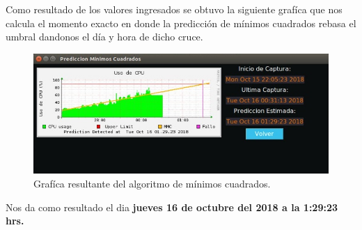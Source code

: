 Como resultado de los valores ingresados se obtuvo la siguiente grafíca que nos calcula el momento exacto en donde la predicción de mínimos cuadrados rebasa el umbral dandonos el día y hora de dicho cruce.

 \FloatBarrier
\begin{figure}[htbp!]
		\centering
		    \includegraphics[width=.9 \textwidth]{../images/graficar.jpeg} 
		\caption{Grafíca resultante del algoritmo de mínimos cuadrados.}
		\label{image:graficar}
\end{figure}
\FloatBarrier

Nos da como resultado el dia \textbf{ jueves 16 de octubre del 2018 a la 1:29:23 hrs.}